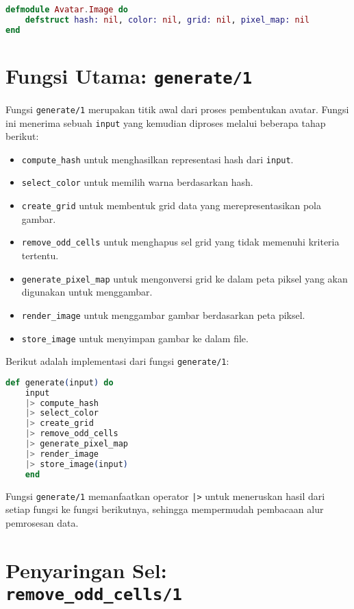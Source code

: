 \begin{lstlisting}[language=Elixir, caption={Keseluruhan Kode src/image.ex}]
defmodule Avatar.Image do
	defstruct hash: nil, color: nil, grid: nil, pixel_map: nil
end
\end{lstlisting}


\section{Fungsi Utama: \texttt{generate/1}}

Fungsi \texttt{generate/1} merupakan titik awal dari proses pembentukan avatar. Fungsi ini menerima sebuah \texttt{input} yang kemudian diproses melalui beberapa tahap berikut:

\begin{itemize}
	\item \texttt{compute\_hash} untuk menghasilkan representasi hash dari \texttt{input}.
	\item \texttt{select\_color} untuk memilih warna berdasarkan hash.
	\item \texttt{create\_grid} untuk membentuk grid data yang merepresentasikan pola gambar.
	\item \texttt{remove\_odd\_cells} untuk menghapus sel grid yang tidak memenuhi kriteria tertentu.
	\item \texttt{generate\_pixel\_map} untuk mengonversi grid ke dalam peta piksel yang akan digunakan untuk menggambar.
	\item \texttt{render\_image} untuk menggambar gambar berdasarkan peta piksel.
	\item \texttt{store\_image} untuk menyimpan gambar ke dalam file.
\end{itemize}

Berikut adalah implementasi dari fungsi \texttt{generate/1}:

\begin{lstlisting}[language=elixir]
	def generate(input) do
	input
	|> compute_hash
	|> select_color
	|> create_grid
	|> remove_odd_cells
	|> generate_pixel_map
	|> render_image
	|> store_image(input)
	end
\end{lstlisting}

Fungsi \texttt{generate/1} memanfaatkan operator \texttt{|>} untuk meneruskan hasil dari setiap fungsi ke fungsi berikutnya, sehingga mempermudah pembacaan alur pemrosesan data.

\section{Penyaringan Sel: \texttt{remove\_odd\_cells/1}}

